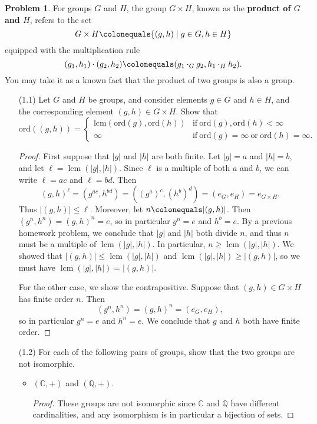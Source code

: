 \documentclass[11pt]{article}
\DeclareMathOperator{\lcm}{lcm}
\newcommand{\C}{\mathbb{C}}
\newcommand{\Q}{\mathbb{Q}}
\theoremstyle{definition}
\newtheorem{problem}{Problem}
\begin{document}
\begin{problem} For groups $G$ and $H$, the group $G \times H$, known as the {\bf product of $G$ and $H$}, refers to the set 
$$G \times H \colonequals \{ (g,h) \mid g \in G, h \in H \}$$
equipped with the multiplication rule 
$$(g_1, h_1) \cdot (g_2, h_2) \colonequals (g_1 \cdot_G g_2, h_1 \cdot_H h_2).$$ 
You may take it as a known fact that the product of two groups is also a group.
\begin{enumerate}
\item[(1.1)]	Let $G$ and $H$ be groups, and consider elements $g \in G$ and $h \in H$, and the corresponding element $(g,h)\in G\times H$. Show that
	\[ \mathrm{ord}((g,h)) = \begin{cases} \mathrm{lcm}( \mathrm{ord}(g) , \mathrm{ord}(h) ) & \text{if} \ \mathrm{ord}(g) ,\mathrm{ord}(h) < \infty \\ 
	\infty & \text{if} \ \mathrm{ord}(g)=\infty \ \text{or} \ \mathrm{ord}(h)=\infty.\end{cases}\]
	
	\begin{proof}
	First suppose that $|g|$ and $|h|$ are both finite.
	Let $|g| = a$ and $|h| = b$, and let $\ell = \lcm(|g|,|h|)$. Since $\ell$ is a multiple of both $a$ and $b$, we can write $\ell = ac$ and $\ell = bd$. Then
	$$(g,h)^\ell = (g^{ac},h^{bd}) = ((g^a)^c,(h^b)^d) = (e_G,e_H) = e_{G \times H}.$$
	Thus $|(g,h)| \leqslant \ell$.
	Moreover, let $n \colonequals |(g,h)|$. Then $(g^n,h^n) = (g,h)^n = e$, so in particular $g^n = e$ and $h^b = e$. By a previous homework problem, we conclude that $|g|$ and $|h|$ both divide $n$, and thus $n$ must be a multiple of $\lcm(|g|,|h|)$. In particular, $n \geqslant \lcm(|g|,|h|)$. We showed that $|(g,h)| \leqslant \lcm(|g|,|h|)$ and $\lcm(|g|,|h|) \geqslant |(g,h)|$, so we must have $\lcm(|g|,|h|) = |(g,h)|$.
	
For the other case, we show the contrapositive. Suppose that $(g,h) \in G \times H$ has finite order $n$. Then
	$$(g^n,h^n) = (g,h)^n = (e_G,e_H),$$
	so in particular $g^n = e$ and $h^n = e$. We conclude that $g$ and $h$ both have finite order.
\end{proof}
	
\item[(1.2)] For each of the following pairs of groups, show that the two groups are not isomorphic.
\begin{itemize}
\item $(\C, +)$ and $(\Q, +)$.

\begin{proof}
These groups are not isomorphic since $\C$ and $\Q$ have different cardinalities, and any isomorphism is in particular a bijection of sets.
\end{proof}
  

\end{itemize}
\end{enumerate}
\end{problem}
\end{document}
